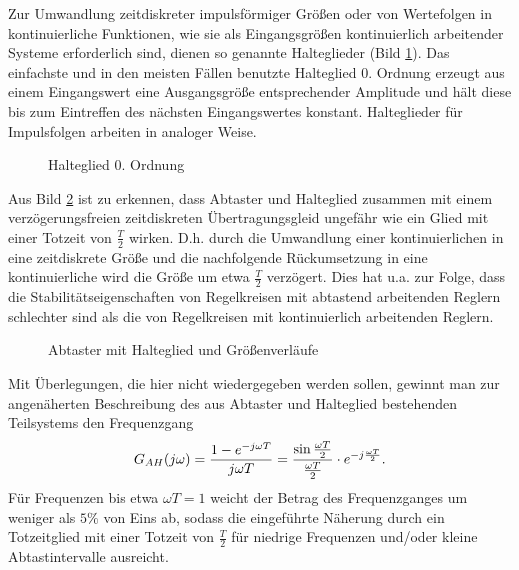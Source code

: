 Zur Umwandlung zeitdiskreter impulsförmiger Größen oder von Wertefolgen in kontinuierliche Funktionen, wie sie als Eingangsgrößen kontinuierlich arbeitender Systeme erforderlich sind, dienen so genannte Halteglieder (Bild \ref{fig:6-4}).
Das einfachste und in den meisten Fällen benutzte Halteglied 0. Ordnung erzeugt aus einem Eingangswert eine Ausgangsgröße entsprechender Amplitude und hält diese bis zum Eintreffen des nächsten Eingangswertes konstant.
Halteglieder für Impulsfolgen arbeiten in analoger Weise.
\begin{figure}[ht]
	\centering
	\caption{Halteglied 0. Ordnung}
	\label{fig:6-4}
\end{figure}
Aus Bild \ref{fig:6-5} ist zu erkennen, dass Abtaster und Halteglied zusammen mit einem verzögerungsfreien zeitdiskreten Übertragungsgleid ungefähr wie ein Glied mit einer Totzeit von \(\frac{T}{2}\) wirken.
D.h. durch die Umwandlung einer kontinuierlichen in eine zeitdiskrete Größe und die nachfolgende Rückumsetzung in eine kontinuierliche wird die Größe um etwa \(\frac{T}{2}\) verzögert.
Dies hat u.a. zur Folge, dass die Stabilitätseigenschaften von Regelkreisen mit abtastend arbeitenden Reglern schlechter sind als die von Regelkreisen mit kontinuierlich arbeitenden Reglern.
\begin{figure}[ht]
	\centering
	\caption{Abtaster mit Halteglied und Größenverläufe}
	\label{fig:6-5}
\end{figure}
Mit Überlegungen, die hier nicht wiedergegeben werden sollen, gewinnt man zur angenäherten Beschreibung des aus Abtaster und Halteglied bestehenden Teilsystems den Frequenzgang
\begin{equation}
	G_{AH}\parentheses*{j\omega} = \frac{1 - e^{-j\omega T}}{j\omega T} = \frac{\sin\frac{\omega T}{2}}{\frac{\omega T}{2}} \cdot e^{-j\frac{\omega T}{2}}.
\end{equation}
Für Frequenzen bis etwa \(\omega T = 1\) weicht der Betrag des Frequenzganges um weniger als \(5\%\) von Eins ab, sodass die eingeführte Näherung durch ein Totzeitglied mit einer Totzeit von \(\frac{T}{2}\) für niedrige Frequenzen und/oder kleine Abtastintervalle ausreicht.

